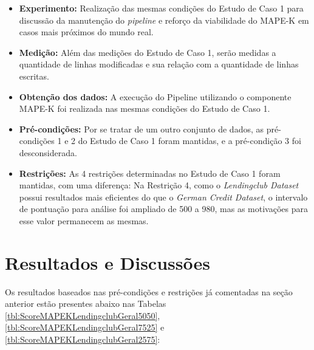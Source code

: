 \documentclass[portugues]{ic-tese}
\begin{document}
\begin{itemize}
\item \textbf{Experimento:} Realização das mesmas condições do Estudo de Caso 1 para discussão da manutenção do \textit{pipeline} e reforço da viabilidade do MAPE-K em casos mais próximos do mundo real.

\item \textbf{Medição:} Além das medições do Estudo de Caso 1, serão medidas a quantidade de linhas modificadas e sua relação com a quantidade de linhas escritas.

\item \textbf{Obtenção dos dados:} A execução do Pipeline utilizando o componente MAPE-K foi realizada nas mesmas condições do Estudo de Caso 1.

\item \textbf{Pré-condições:} Por se tratar de um outro conjunto de dados, as pré-condições 1 e 2 do Estudo de Caso 1 foram mantidas, e a pré-condição 3 foi desconsiderada.

\item \textbf{Restrições:} As 4 restrições determinadas no Estudo de Caso 1 foram mantidas, com uma diferença: Na Restrição 4, como o \textit{Lendingclub Dataset} possui resultados mais eficientes do que o \textit{German Credit Dataset}, o intervalo de pontuação para análise foi ampliado de 500 a 980, mas as motivações para esse valor permanecem as mesmas.
\end{itemize}

\section{Resultados e Discussões}

Os resultados baseados nas pré-condições e restrições já comentadas na seção anterior estão presentes abaixo nas Tabelas \ref{tbl:ScoreMAPEKLendingclubGeral5050}, \ref{tbl:ScoreMAPEKLendingclubGeral7525} e \ref{tbl:ScoreMAPEKLendingclubGeral2575}:
\end{document}

